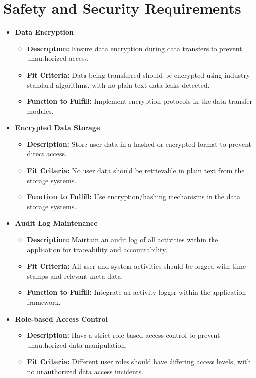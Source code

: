 \documentclass{article}
\newcounter{srnum} %
\newcommand{\rthesrnum}{SR\refstepcounter{srnum}\thesrnum:}
\begin{document}
\section{Safety and Security Requirements}
\begin{itemize}[leftmargin=16.5mm,labelsep=4mm,label=\rthesrnum]
\item \textbf{Data Encryption}
  \begin{itemize}
  \item \textbf{Description:} Ensure data encryption during data transfers to prevent unauthorized access.
  \item \textbf{Fit Criteria:} Data being transferred should be encrypted using industry-standard algorithms, with no plain-text data leaks detected.
  \item \textbf{Function to Fulfill:} Implement encryption protocols in the data transfer modules.
  \end{itemize}
\item \textbf{Encrypted Data Storage}
  \begin{itemize}
  \item \textbf{Description:} Store user data in a hashed or encrypted format to prevent direct access.
  \item \textbf{Fit Criteria:} No user data should be retrievable in plain text from the storage systems.
  \item \textbf{Function to Fulfill:} Use encryption/hashing mechanisms in the data storage systems.
  \end{itemize}
\item \textbf{Audit Log Maintenance}
  \begin{itemize}
  \item \textbf{Description:} Maintain an audit log of all activities within the application for traceability and accountability.
  \item \textbf{Fit Criteria:} All user and system activities should be logged with time stamps and relevant meta-data.
  \item \textbf{Function to Fulfill:} Integrate an activity logger within the application framework.
  \end{itemize}
\item \textbf{Role-based Access Control}
  \begin{itemize}
  \item \textbf{Description:} Have a strict role-based access control to prevent unauthorized data manipulation.
  \item \textbf{Fit Criteria:} Different user roles should have differing access levels, with no unauthorized data access incidents.

\end{itemize}
\end{itemize}
\end{document}

